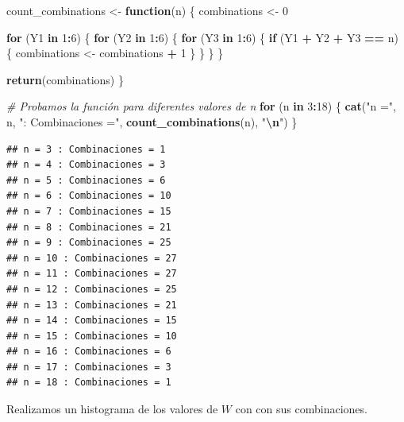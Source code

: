 \documentclass[
]{article}
\newenvironment{Shaded}{\begin{snugshade}}{\end{snugshade}}
\newcommand{\CommentTok}[1]{\textcolor[rgb]{0.56,0.35,0.01}{\textit{#1}}}
\newcommand{\ControlFlowTok}[1]{\textcolor[rgb]{0.13,0.29,0.53}{\textbf{#1}}}
\newcommand{\DecValTok}[1]{\textcolor[rgb]{0.00,0.00,0.81}{#1}}
\newcommand{\FunctionTok}[1]{\textcolor[rgb]{0.13,0.29,0.53}{\textbf{#1}}}
\newcommand{\NormalTok}[1]{#1}
\newcommand{\OtherTok}[1]{\textcolor[rgb]{0.56,0.35,0.01}{#1}}
\newcommand{\SpecialCharTok}[1]{\textcolor[rgb]{0.81,0.36,0.00}{\textbf{#1}}}
\newcommand{\StringTok}[1]{\textcolor[rgb]{0.31,0.60,0.02}{#1}}
\begin{document}
\begin{Shaded}
\begin{Highlighting}[]
\NormalTok{count\_combinations }\OtherTok{\textless{}{-}} \ControlFlowTok{function}\NormalTok{(n) \{}
\NormalTok{  combinations }\OtherTok{\textless{}{-}} \DecValTok{0}
  
  \ControlFlowTok{for}\NormalTok{ (Y1 }\ControlFlowTok{in} \DecValTok{1}\SpecialCharTok{:}\DecValTok{6}\NormalTok{) \{}
    \ControlFlowTok{for}\NormalTok{ (Y2 }\ControlFlowTok{in} \DecValTok{1}\SpecialCharTok{:}\DecValTok{6}\NormalTok{) \{}
      \ControlFlowTok{for}\NormalTok{ (Y3 }\ControlFlowTok{in} \DecValTok{1}\SpecialCharTok{:}\DecValTok{6}\NormalTok{) \{}
        \ControlFlowTok{if}\NormalTok{ (Y1 }\SpecialCharTok{+}\NormalTok{ Y2 }\SpecialCharTok{+}\NormalTok{ Y3 }\SpecialCharTok{==}\NormalTok{ n) \{}
\NormalTok{          combinations }\OtherTok{\textless{}{-}}\NormalTok{ combinations }\SpecialCharTok{+} \DecValTok{1}
\NormalTok{        \}}
\NormalTok{      \}}
\NormalTok{    \}}
\NormalTok{  \}}
  
  \FunctionTok{return}\NormalTok{(combinations)}
\NormalTok{\}}

\CommentTok{\# Probamos la función para diferentes valores de n}
\ControlFlowTok{for}\NormalTok{ (n }\ControlFlowTok{in} \DecValTok{3}\SpecialCharTok{:}\DecValTok{18}\NormalTok{) \{}
  \FunctionTok{cat}\NormalTok{(}\StringTok{"n ="}\NormalTok{, n, }\StringTok{": Combinaciones ="}\NormalTok{, }\FunctionTok{count\_combinations}\NormalTok{(n), }\StringTok{"}\SpecialCharTok{\textbackslash{}n}\StringTok{"}\NormalTok{)}
\NormalTok{\}}
\end{Highlighting}
\end{Shaded}

\begin{verbatim}
## n = 3 : Combinaciones = 1 
## n = 4 : Combinaciones = 3 
## n = 5 : Combinaciones = 6 
## n = 6 : Combinaciones = 10 
## n = 7 : Combinaciones = 15 
## n = 8 : Combinaciones = 21 
## n = 9 : Combinaciones = 25 
## n = 10 : Combinaciones = 27 
## n = 11 : Combinaciones = 27 
## n = 12 : Combinaciones = 25 
## n = 13 : Combinaciones = 21 
## n = 14 : Combinaciones = 15 
## n = 15 : Combinaciones = 10 
## n = 16 : Combinaciones = 6 
## n = 17 : Combinaciones = 3 
## n = 18 : Combinaciones = 1
\end{verbatim}

Realizamos un histograma de los valores de $W$ con con sus combinaciones.
\end{document}
